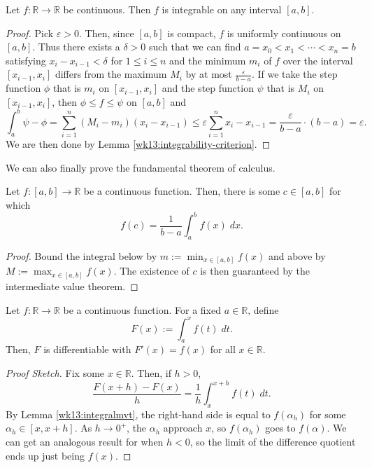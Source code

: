 \documentclass[10pt]{scrartcl}
\providecommand{\eps}{\varepsilon}
\providecommand{\RR}{\mathbb R}
\providecommand{\dif}{\;d}
\begin{document}
\begin{theorem}
	Let $f\colon\RR\to\RR$ be continuous. Then $f$
	is integrable on any interval $[a,b]$.
\end{theorem}

\begin{proof}
	Pick $\eps > 0$. Then, since $[a,b]$ is compact,
	$f$ is uniformly continuous on $[a,b]$.
	Thus there exists a $\delta> 0$ such that
	we can find $a = x_0 < x_1 < \cdots < x_n = b$
	satisfying $x_i - x_{i-1} < \delta$ for $1\le i\le n$ and
	the minimum $m_i$ of $f$ over the interval $[x_{i-1}, x_i]$
	differs from the maximum $M_i$ by at most $\frac{\eps}{b-a}$.
	If we take the step function $\phi$ that is $m_i$ on $[x_{i-1}, x_i]$
	and the step function $\psi$ that is $M_i$ on $[x_{i-1}, x_i]$, then
	$\phi \le f \le \psi$ on $[a,b]$ and
	\[\int_a^b \psi - \phi = \sum_{i=1}^n (M_i - m_i)(x_i - x_{i-1})
	\le \eps\sum_{i=1}^n x_i - x_{i-1} = \frac{\eps}{b-a}\cdot(b-a) = \eps.\]
	We are then done by Lemma \ref{wk13:integrability-criterion}.	
\end{proof}

We can also finally prove the fundamental theorem of calculus.
\begin{lemma}\label{wk13:integralmvt}
	Let $f\colon[a,b]\to\RR$ be a continuous function.
	Then, there is some $c\in[a,b]$ for which
	\[f(c) = \frac{1}{b-a}\int_a^b f(x)\dif x.\]
\end{lemma}

\begin{proof}
	Bound the integral below by $m := \min_{x\in[a,b]} f(x)$
	and above by $M := \max_{x\in[a,b]} f(x)$.
	The existence of $c$ is then guaranteed by the intermediate value theorem.
\end{proof}

\begin{theorem}
	Let $f\colon\RR\to\RR$ be a continuous function.
	For a fixed $a\in\RR$, define
	\[F(x) := \int_a^x f(t)\dif t.\]
	Then, $F$ is differentiable with $F'(x) = f(x)$ for all $x\in\RR$.
\end{theorem}

\begin{proof}[Proof Sketch]
	Fix some $x\in\RR$. Then, if $h > 0$,
	\[\frac{F(x+h) - F(x)}{h} = \frac 1h\int_x^{x+h} f(t)\dif t.\]
	By Lemma \ref{wk13:integralmvt}, the right-hand side is equal to
	$f(\alpha_h)$ for some $\alpha_h\in[x, x+h]$.
	As $h\to 0^+$, the $\alpha_h$ approach $x$, so $f(\alpha_h)$ goes to
	$f(\alpha)$. We can get an analogous result for when $h < 0$,
	so the limit of the difference quotient ends up just being $f(x)$.
\end{proof}
\end{document}
